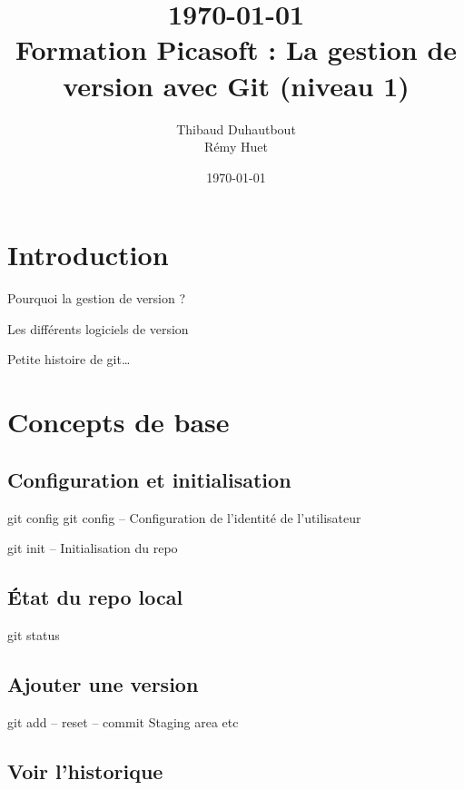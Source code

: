 \documentclass[usepdftitle=false]{beamer}
\title[Formation Git\_v1]{\today \\ Formation Picasoft : La gestion de version avec Git (niveau 1)}
\author[Duhautbout - Huet]{Thibaud {\sc Duhautbout} \\ Rémy {\sc Huet}}
\institute[Picasoft]{Association Picasoft}
\date\today
\begin{document}
\begin{frame}
	\titlepage 
\end{frame}

\section{Introduction}

\begin{frame}{Pourquoi la gestion de version ?}
\end{frame}

\begin{frame}{Les différents logiciels de version}
\end{frame}

\begin{frame}{Petite histoire de git\ldots}
\end{frame}

\section{Concepts de base}

\subsection{Configuration et initialisation}

\begin{frame}{git config}
	git config -- Configuration de l'identité de l'utilisateur

	git init -- Initialisation du repo
\end{frame}

\subsection{\'Etat du repo local}

\begin{frame}{git status}
\end{frame}

\subsection{Ajouter une version}

\begin{frame}{git add -- reset -- commit}
	Staging area etc
\end{frame}

\subsection{Voir l'historique}
\end{document}

